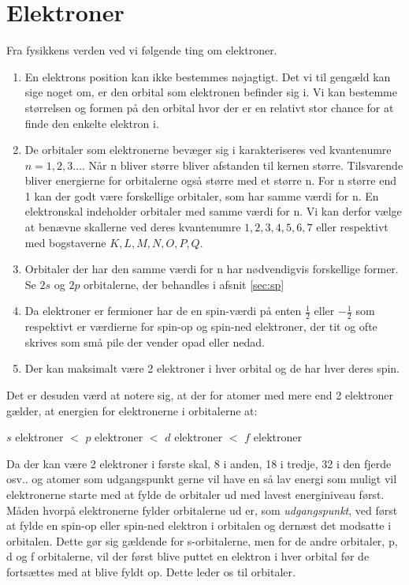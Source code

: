 
\section{Elektroner}\label{elektroner}
Fra fysikkens verden ved vi følgende ting om elektroner. 

\begin{enumerate}
\item En elektrons position kan ikke bestemmes nøjagtigt. Det vi til gengæld kan sige noget om, er den orbital som elektronen befinder sig i. Vi kan bestemme størrelsen og formen på den orbital hvor der er en relativt stor chance for at finde den enkelte elektron i.

\item De orbitaler som elektronerne bevæger sig i karakteriseres ved kvantenumre $n = 1,2,3 ...$. Når n bliver større bliver afstanden til kernen større. Tilsvarende bliver energierne for orbitalerne også større med et større n. For n større end 1 kan der godt være forskellige orbitaler, som har samme værdi for n. En elektronskal indeholder orbitaler med samme værdi for n. Vi kan derfor vælge at benævne skallerne ved deres kvantenumre $1,2,3,4,5,6,7$ eller respektivt med bogstaverne $K,L,M,N,O,P,Q$. 

\item Orbitaler der har den samme værdi for n har nødvendigvis forskellige former. Se $2s$ og $2p$ orbitalerne, der behandles i afsnit \ref{sec:sp}

\item Da elektroner er fermioner har de en spin-værdi på enten $\frac{1}{2}$ eller $-\frac{1}{2}$ som respektivt er værdierne for spin-op og spin-ned elektroner, der tit og ofte skrives som små pile der vender opad eller nedad.
\\

\item Der kan maksimalt være 2 elektroner i hver orbital og de har hver deres spin.
\end{enumerate}

Det er desuden værd at notere sig, at der for atomer med mere end 2 elektroner gælder, at energien for elektronerne i orbitalerne at:

\bigskip
\begin{center}
$s$ elektroner $<$ $p$ elektroner $<$ $d$ elektroner $<$ $f$ elektroner
\end{center}
\bigskip

Da der kan være 2 elektroner i første skal, 8 i anden, 18 i tredje, 32 i den fjerde osv.. og atomer som udgangspunkt gerne vil have en så lav energi som muligt vil elektronerne starte med at fylde de orbitaler ud med lavest energiniveau først. Måden hvorpå elektronerne fylder orbitalerne ud er, som \emph{udgangspunkt}, ved først at fylde en spin-op eller spin-ned elektron i orbitalen og dernæst det modsatte i orbitalen. Dette gør sig gældende for s-orbitalerne, men for de andre orbitaler, p, d og f orbitalerne, vil der først blive puttet en elektron i hver orbital før de fortsættes med at blive fyldt op. Dette leder os til orbitaler.